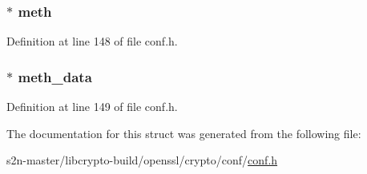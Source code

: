 \subsubsection[{\texorpdfstring{meth}{meth}}]{ $\ast$ meth}\hypertarget{structconf__st_a4244cbf93eda670a1fb2e964e2b9dcfb}{}\label{structconf__st_a4244cbf93eda670a1fb2e964e2b9dcfb}


Definition at line 148 of file conf.\+h.

\subsubsection[{\texorpdfstring{meth\+\_\+data}{meth_data}}]{ $\ast$ meth\+\_\+data}\hypertarget{structconf__st_abb3014ed4d11f8b0d1e88bc8ba42fd83}{}\label{structconf__st_abb3014ed4d11f8b0d1e88bc8ba42fd83}


Definition at line 149 of file conf.\+h.



The documentation for this struct was generated from the following file\+:\begin{DoxyCompactItemize}
\item 
s2n-\/master/libcrypto-\/build/openssl/crypto/conf/\hyperlink{crypto_2conf_2conf_8h}{conf.\+h}\end{DoxyCompactItemize}
